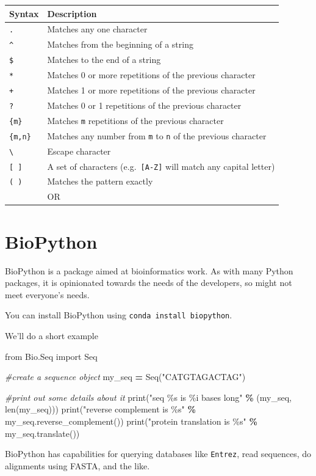 \documentclass[
  letterpaper,
]{scrbook}
\newenvironment{Shaded}{\begin{snugshade}}{\end{snugshade}}
\newcommand{\BuiltInTok}[1]{#1}
\newcommand{\CommentTok}[1]{\textcolor[rgb]{0.56,0.35,0.01}{\textit{#1}}}
\newcommand{\ImportTok}[1]{#1}
\newcommand{\NormalTok}[1]{#1}
\newcommand{\OperatorTok}[1]{\textcolor[rgb]{0.81,0.36,0.00}{\textbf{#1}}}
\newcommand{\SpecialCharTok}[1]{\textcolor[rgb]{0.00,0.00,0.00}{#1}}
\newcommand{\StringTok}[1]{\textcolor[rgb]{0.31,0.60,0.02}{#1}}
\begin{document}
\begin{longtable}[]{@{}ll@{}}
\toprule
Syntax & Description\tabularnewline
\midrule
\endhead
\texttt{.} & Matches any one character\tabularnewline
\texttt{\^{}} & Matches from the beginning of a string\tabularnewline
\texttt{\$} & Matches to the end of a string\tabularnewline
\texttt{*} & Matches 0 or more repetitions of the previous character\tabularnewline
\texttt{+} & Matches 1 or more repetitions of the previous character\tabularnewline
\texttt{?} & Matches 0 or 1 repetitions of the previous character\tabularnewline
\texttt{\{m\}} & Matches \texttt{m} repetitions of the previous character\tabularnewline
\texttt{\{m,n\}} & Matches any number from \texttt{m} to \texttt{n} of the previous character\tabularnewline
\texttt{\textbackslash{}} & Escape character\tabularnewline
\texttt{{[}\ {]}} & A set of characters (e.g.~\texttt{{[}A-Z{]}} will match any capital letter)\tabularnewline
\texttt{(\ )} & Matches the pattern exactly\tabularnewline
\texttt{\textbar{}} & OR\tabularnewline
\bottomrule
\end{longtable}

\hypertarget{biopython}{%
\chapter{BioPython}\label{biopython}}

BioPython is a package aimed at bioinformatics work. As with many Python packages, it is opinionated towards the needs of the developers, so might not meet everyone's needs.

You can install BioPython using \texttt{conda\ install\ biopython}.

We'll do a short example

\begin{Shaded}
\begin{Highlighting}[]
\ImportTok{from}\NormalTok{ Bio.Seq }\ImportTok{import}\NormalTok{ Seq}

\CommentTok{\#create a sequence object}
\NormalTok{my\_seq }\OperatorTok{=}\NormalTok{ Seq(}\StringTok{"CATGTAGACTAG"}\NormalTok{)}

\CommentTok{\#print out some details about it}
\BuiltInTok{print}\NormalTok{(}\StringTok{"seq }\SpecialCharTok{\%s}\StringTok{ is }\SpecialCharTok{\%i}\StringTok{ bases long"} \OperatorTok{\%}\NormalTok{ (my\_seq, }\BuiltInTok{len}\NormalTok{(my\_seq)))}
\BuiltInTok{print}\NormalTok{(}\StringTok{"reverse complement is }\SpecialCharTok{\%s}\StringTok{"} \OperatorTok{\%}\NormalTok{ my\_seq.reverse\_complement())}
\BuiltInTok{print}\NormalTok{(}\StringTok{"protein translation is }\SpecialCharTok{\%s}\StringTok{"} \OperatorTok{\%}\NormalTok{ my\_seq.translate())}
\end{Highlighting}
\end{Shaded}

BioPython has capabilities for querying databases like \texttt{Entrez}, read sequences, do alignments using FASTA, and the like.
\end{document}
